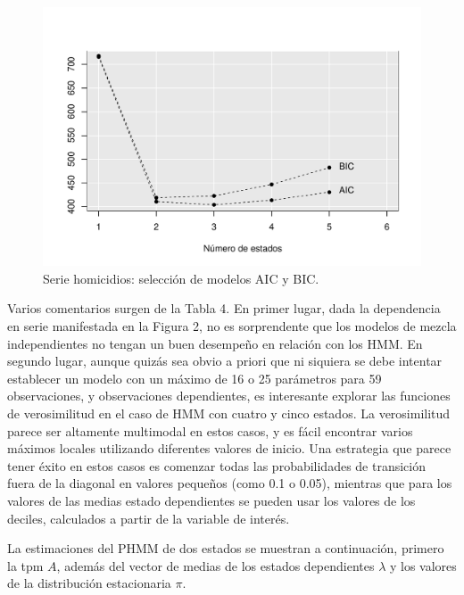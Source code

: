 \documentclass[a4paper]{article}\usepackage[]{graphicx}\usepackage[]{color}
\makeatletter
\def\maxwidth{ %
  \ifdim\Gin@nat@width>\linewidth
    \linewidth
  \else
    \Gin@nat@width
  \fi
}
\newenvironment{knitrout}{}{} %
\makeatother
\begin{document}
\begin{knitrout}
\color{fgcolor}\begin{figure}[h]
\includegraphics[width=\maxwidth]{figure/unnamed-chunk-13-1} \caption[Serie homicidios]{Serie homicidios: selección de modelos AIC y BIC.}\label{fig:unnamed-chunk-13}
\end{figure}


\end{knitrout}

Varios comentarios surgen de la Tabla 4. En primer lugar, dada la dependencia en serie manifestada en la Figura 2, no es sorprendente que los modelos de mezcla independientes no tengan un buen desempeño en relación con los HMM. En segundo lugar, aunque quizás sea obvio a priori que ni siquiera se debe intentar establecer un modelo con un máximo de 16 o 25 parámetros para 59 observaciones, y observaciones dependientes, es interesante explorar las funciones de verosimilitud en el caso de HMM con cuatro y cinco estados. La verosimilitud parece ser altamente multimodal en estos casos, y es fácil encontrar varios máximos locales utilizando diferentes valores de inicio. Una estrategia que parece tener éxito en estos casos es comenzar todas las probabilidades de transición fuera de la diagonal en valores pequeños (como 0.1 o 0.05), mientras que para los valores de las medias estado dependientes se pueden usar los valores de los deciles, calculados a partir de la variable de interés.



La estimaciones del PHMM de dos estados se muestran a continuación, primero la tpm $A$, además del vector de medias de los estados dependientes $\lambda$ y los valores de la distribución estacionaria $\pi$. 
\end{document}
